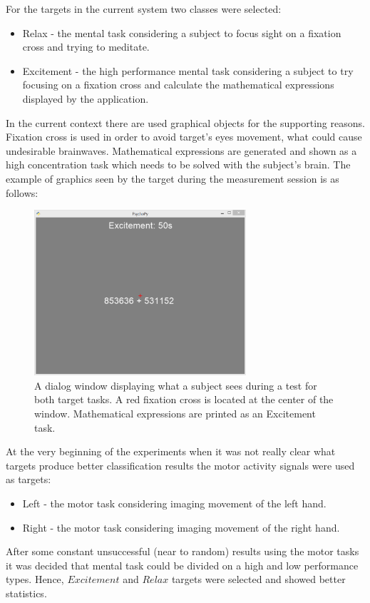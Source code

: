\documentclass[12pt]{article}
\begin{document}
For the targets in the current system two classes were selected: 
\begin{itemize}
\item Relax - the mental task considering a subject to focus sight on a fixation cross and trying to meditate.
\item Excitement - the high performance mental task considering a subject to try focusing on a fixation cross and calculate the mathematical expressions displayed by the application.
\end{itemize}

In the current context there are used graphical objects for the supporting reasons. Fixation cross is used in order to avoid target's eyes movement, what could cause undesirable brainwaves. Mathematical expressions are generated and shown as a high concentration task which needs to be solved with the subject's brain. The example of graphics seen by the target  during the measurement session is as follows:

\begin{figure} [H]
\begin{center}
\includegraphics[width=0.7\textwidth]{test_ui}
\caption{A dialog window displaying what a subject sees during a test for both target tasks. A red fixation cross is located at the center of the window. Mathematical expressions are printed as an Excitement task.}
\label{fig:fnCompModel}
\end{center}
\end{figure}

At the very beginning of the experiments when it was not really clear what targets produce better classification results the motor activity signals were used as targets:
\begin{itemize}
\item Left - the motor task considering imaging movement of the left hand.
\item Right - the motor task considering imaging movement of the right hand.
\end{itemize}
After some constant unsuccessful (near to random) results using the motor tasks it was decided that mental task could be divided on a high and low performance types. Hence, $Excitement$ and $Relax$ targets were selected and showed better statistics.
\end{document}
